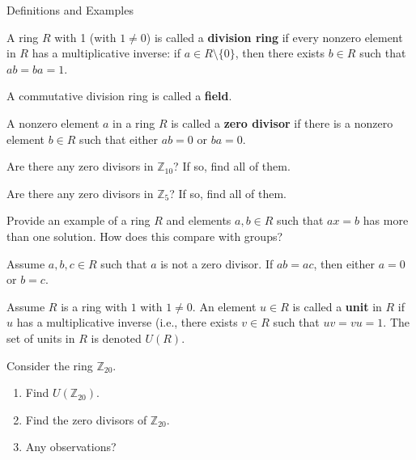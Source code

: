 \begin{section}{Definitions and Examples}
\begin{definition}
A ring $R$ with 1 (with $1\neq 0$) is called a \textbf{division ring} if every nonzero element in $R$ has a multiplicative inverse: if $a\in R\setminus\{0\}$, then there exists $b\in R$ such that $ab=ba=1$.
\end{definition}

\begin{definition}
A commutative division ring is called a \textbf{field}.
\end{definition}

\begin{definition}
A nonzero element $a$ in a ring $R$ is called a \textbf{zero divisor} if there is a nonzero element $b\in R$ such that either $ab=0$ or $ba=0$.
\end{definition}

\begin{exercise}
Are there any zero divisors in $\mathbb{Z}_{10}$?  If so, find all of them.
\end{exercise}

\begin{exercise}
Are there any zero divisors in $\mathbb{Z}_5$?  If so, find all of them.
\end{exercise}

\begin{exercise}
Provide an example of a ring $R$ and elements $a,b\in R$ such that $ax=b$ has more than one solution.  How does this compare with groups?
\end{exercise}

\begin{theorem}\label{thm:RingCancellation}
Assume $a,b,c\in R$ such that $a$ is not a zero divisor.  If $ab=ac$, then either $a=0$ or $b=c$.
\end{theorem}

\begin{definition}
Assume $R$ is a ring with $1$ with $1\neq 0$. An element $u\in R$ is called a \textbf{unit} in $R$ if $u$ has a multiplicative inverse (i.e., there exists $v\in R$ such that $uv=vu=1$.  The set of units in $R$ is denoted $U(R)$.
\end{definition}

\begin{exercise}
Consider the ring $\mathbb{Z}_{20}$.
\begin{enumerate}[label=\rm{(\alph*)}]
\item Find $U(\mathbb{Z}_{20})$.
\item Find the zero divisors of $\mathbb{Z}_{20}$.
\item Any observations?
\end{enumerate}
\end{exercise}


\end{section}
